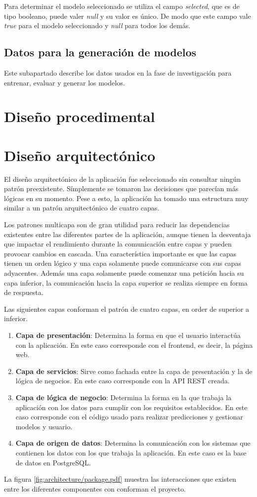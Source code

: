 Para determinar el modelo seleccionado se utiliza el campo \textit{selected},
que es de tipo booleano, puede valer \textit{null} y su valor es único. De modo
que este campo vale \textit{true} para el modelo seleccionado y \textit{null}
para todos los demás.

\subsection{Datos para la generación de modelos}

Este subapartado describe los datos usados en la fase de investigación para
entrenar, evaluar y generar los modelos.

\section{Diseño procedimental}

\section{Diseño arquitectónico}

El diseño arquitectónico de la aplicación fue seleccionado sin consultar ningún
patrón preexistente. Símplemente se tomaron las decisiones que parecían más
lógicas en su momento. Pese a esto, la aplicación ha tomado una estructura muy
similar a un patrón arquitectónico de cuatro capas.

Los patrones multicapa son de gran utilidad para reducir las dependencias
existentes entre las diferentes partes de la aplicación, aunque tienen la
desventaja que impactar el rendimiento durante la comunicación entre capas y
pueden provocar cambios en cascada. Una característica importante es que las
capas tienen un orden lógico y una capa solamente puede comunicarse con sus
capas adyacentes. Además una capa solamente puede comenzar una petición hacia su
capa inferior, la comunicación hacia la capa superior se realiza siempre en
forma de respuesta.

Las siguientes capas conforman el patrón de cuatro capas, en order de superior a
inferior.

\begin{enumerate}
    \item \textbf{Capa de presentación}: Determina la forma en que el usuario
    interactúa con la aplicación. En este caso corresponde con el frontend, es
    decir, la página web.
    \item \textbf{Capa de servicios}: Sirve como fachada entre la capa de
    presentación y la de lógica de negocios. En este caso corresponde con la API
    REST creada.
    \item \textbf{Capa de lógica de negocio}: Determina la forma en la que
    trabaja la aplicación con los datos para cumplir con los requisitos
    establecidos. En este caso corresponde con el código usado para realizar
    predicciones y gestionar modelos y usuario.
    \item \textbf{Capa de origen de datos}: Determina la comunicación con los
    sistemas que contienen los datos con los que trabaja la aplicación. En este
    caso es la base de datos en PostgreSQL.
\end{enumerate}

La figura \ref{fig:architecture/package.pdf} muestra las interacciones que
existen entre los diferentes componentes con conforman el proyecto.


